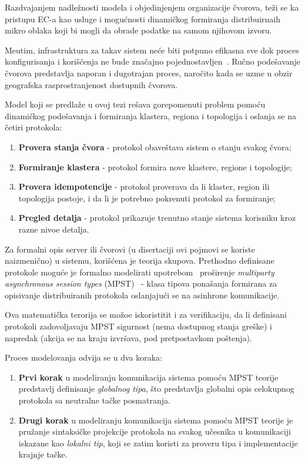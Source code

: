 Razdvajanjem nadle\v znosti modela i objedinjenjem organizacije \v cvorova, te\v zi se ka pristupu EC-a kao usluge i mogu\'cnosti dinami\v ckog formiranja distribuirnaih mikro oblaka koji bi mogli da obrade podatke na samom njihovom izvoru.

Me\dj utim, infrastruktura za takav sistem ne\'ce biti potpuno efikasna sve dok proces konfigurisanja i kori\v s\'cenja ne bude zna\v cajno pojednostavljen~\cite{SatyanarayananBCD09}. Ru\v cno pode\v savanje \v cvorova predstavlja naporan i dugotrajan proces, naro\v cito kada se uzme u obzir geografska rasprostranjenost dostupnih \v cvorova. 

Model koji se predla\v ze u ovoj tezi re\v sava gorepomenuti problem pomo\'cu  dinami\v ckog pode\v savanja i formiranja klastera, regiona i topologija i oslanja se na \v cetiri protokola:

\begin{enumerate}[start=1,label={(\bfseries \arabic*)}]
	\item \textbf{Provera stanja \v cvora} - protokol obave\v stava sistem o stanju svakog \v cvora; 
	\item \textbf{Formiranje klastera} - protokol formira nove klastere, regione i topologije;
	\item \textbf{Provera idempotencije} - protokol proverava da li klaster, region ili topologija postoje, i da li je potrebno pokrenuti protokol za formiranje;
	\item \textbf{Pregled detalja} - protokol prikazuje trenutno stanje sistema korisniku kroz razne nivoe detalja.
\end{enumerate}

Za formalni opis server ili \v cvorovi (u disertaciji ovi pojmovi se koriste naizmeni\v cno) u sistemu, kori\v s\'cena je teorija skupova. Prethodno definisane protokole mogu\'ce je formalno modelirati upotrebom~\cite{HuY17} pro\v sirenje \emph{multiparty asynchronous session types} (MPST)~\cite {HondaYC08} - klasa tipova pona\v sanja formirana za opisivanje distribuiranih protokola oslanjaju\'ci se na asinhrone komunikacije.

Ova matemati\v cka terorija se mo\v zoe iskoristitit i za verifikaciju, da li definisani protokoli zadovoljavaju MPST sigurnost (nema dostupnog stanja gre\v ske) i napredak (akcija se na kraju izvr\v sava, pod pretpostavkom po\v stenja).

Proces modelovanja odvija se u dva koraka:

\begin{enumerate}[start=1,label={(\bfseries \arabic*)}]
	\item \textbf{Prvi korak} u modeliranju komunikacija sistema pomo\'cu MPST teorije predstavlj definisanje \emph{globalnog tipa}, \v sto predstavlja globalni opis celokupnog protokola sa neutralne ta\v cke posmatranja.
	\item \textbf{Drugi korak} u modeliranju komunikacija sistema pomo\'cu MPST teorije je pru\v zanje sintaksi\v cke projekcije protokola na svakog u\v cesnika u komunikaciji iskazane kao \emph{lokalni tip}, koji se zatim koristi za proveru tipa i implementacije krajnje ta\v cke.
\end{enumerate}

